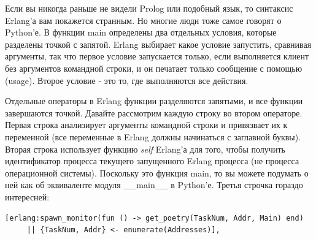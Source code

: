 Если вы никогда раньше не видели Prolog или подобный 
язык, то синтаксис Erlang'а вам покажется странным. 
Но многие люди тоже самое говорят о Python'е. В функции  
main определены два отдельных условия, которые разделены  
точкой с запятой. Erlang выбирает какое условие запустить, 
сравнивая аргументы, так что первое условие запускается 
только, если выполняется клиент без  
аргументов командной строки, и он печатает только 
сообщение с помощью (usage). Второе условие - это то, где 
выполняются все действия. 


Отдельные операторы в Erlang функции разделяются запятыми, 
и все функции завершаются точкой. Давайте рассмотрим  
каждую строку во втором операторе. Первая строка анализирует  
аргументы командной строки и привязвает их к переменной (все 
переменные в Erlang должны начинаться с заглавной буквы). Вторая строка 
использует функцию \textit{self} Erlang'а для того, чтобы получить 
идентификатор процесса текущего запущенного Erlang процесса (не 
процесса операционной системы). Поскольку это функция main, то 
вы можете подумать о ней как об эквиваленте модуля \_\_main\_\_ в Python'е. 
Третья строчка гораздо интересней: 

\begin{scriptsize}\begin{verbatim}
[erlang:spawn_monitor(fun () -> get_poetry(TaskNum, Addr, Main) end)
     || {TaskNum, Addr} <- enumerate(Addresses)],
\end{verbatim}\end{scriptsize}



